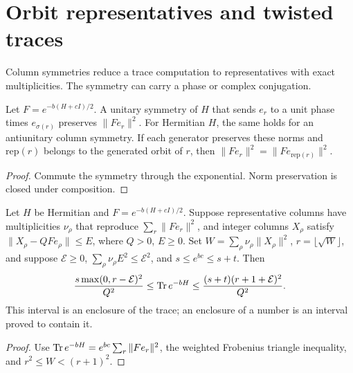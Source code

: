 \section{Orbit representatives and twisted traces}

Column symmetries reduce a trace computation to representatives with exact multiplicities.
The symmetry can carry a phase or complex conjugation.

\begin{lemma}
  \label{lem:trace-orbits}
  \leanok
  Let \(F=e^{-b(H+cI)/2}\).
  A unitary symmetry of \(H\) that sends \(e_r\) to a unit phase times \(e_{\sigma(r)}\)
  preserves \(\|Fe_r\|^2\). For Hermitian \(H\), the same holds for an antiunitary column symmetry.
  If each generator preserves these norms and \(\mathrm{rep}(r)\) belongs to the generated
  orbit of \(r\), then \(\|Fe_r\|^2=\|Fe_{\mathrm{rep}(r)}\|^2\).
\end{lemma}
\begin{proof}
  \leanok
  Commute the symmetry through the exponential. Norm preservation is closed under composition.
\end{proof}

\begin{lemma}
  \label{lem:trace-frobenius}
  \leanok
  Let \(H\) be Hermitian and \(F=e^{-b(H+cI)/2}\).
  Suppose representative columns have multiplicities \(\nu_\rho\) that reproduce
  \(\sum_r\|Fe_r\|^2\), and integer columns \(X_\rho\) satisfy
  \(\|X_\rho-QFe_\rho\|\le E\), where \(Q>0\), \(E\ge0\).
  Set \(W=\sum_\rho\nu_\rho\|X_\rho\|^2\), \(r=\lfloor\sqrt W\rfloor\), and suppose
  \(\mathcal E\ge0\), \(\sum_\rho\nu_\rho E^2\le\mathcal E^2\), and
  \(s\le e^{bc}\le s+t\). Then
  \[
    \frac{s\max(0,r-\mathcal E)^2}{Q^2}
    \le \operatorname{Tr} e^{-bH}\le
    \frac{(s+t)(r+1+\mathcal E)^2}{Q^2}.
  \]
  This interval is an enclosure of the trace; an enclosure of a number is an interval proved
  to contain it.
\end{lemma}
\begin{proof}
  \leanok
  Use \(\operatorname{Tr} e^{-bH}=e^{bc}\sum_r\|Fe_r\|^2\), the weighted Frobenius triangle inequality,
  and \(r^2\le W<(r+1)^2\).
\end{proof}

